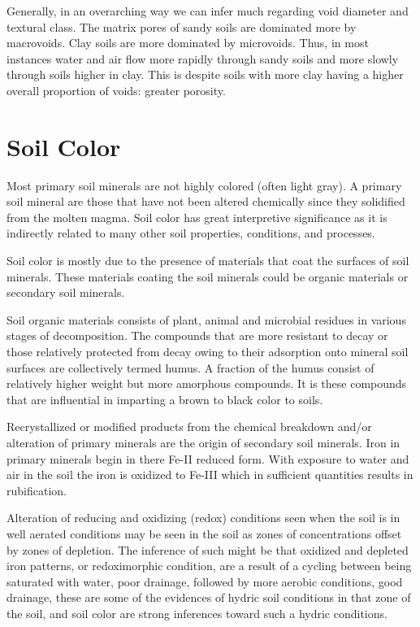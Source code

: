 \documentclass[letterpaper, 12pt]{article}
\begin{document}
Generally, in an overarching way we can infer much regarding void diameter and textural class. The matrix pores of sandy soils are dominated more by macrovoids. Clay soils are more dominated by microvoids. Thus, in most instances water and air flow more rapidly through sandy soils and more slowly through soils higher in clay. This is despite soils with more clay having a higher overall proportion of voids: greater porosity.

\section{Soil Color}
\label{color}
    
Most primary soil minerals are not highly colored (often light gray). A primary soil mineral are those that have not been altered chemically since they solidified from the molten magma. Soil color has great interpretive significance as it is indirectly related to many other soil properties, conditions, and processes.

Soil color is mostly due to the presence of materials that coat the surfaces of soil minerals. These materials coating the soil minerals could be organic materials or secondary soil minerals.

Soil organic materials consists of plant, animal and microbial residues in various stages of decomposition. The compounds that are more resistant to decay or those relatively protected from decay owing to their adsorption onto mineral soil surfaces are  collectively termed humus. A fraction of the humus consist of relatively higher weight but more amorphous compounds. It is these compounds that are influential in imparting a brown to black color to soils.

Recrystallized or modified products from the chemical breakdown and/or alteration of primary minerals are the origin of secondary soil minerals. Iron in primary minerals begin in there Fe-II reduced form. With exposure to water and air in the soil the iron is oxidized to Fe-III which in sufficient quantities results in rubification.
 
Alteration of reducing and oxidizing (redox) conditions seen when the soil is in well aerated conditions may be seen in the soil as zones of concentrations offset by zones of depletion. The inference of such might be that oxidized and depleted iron patterns, or redoximorphic condition, are a result of a cycling between being saturated with water, poor drainage, followed by more aerobic conditions, good drainage, these are some of the evidences of hydric soil conditions in that zone of the soil, and soil color are strong inferences toward such a hydric conditions.
    
\end{document}
